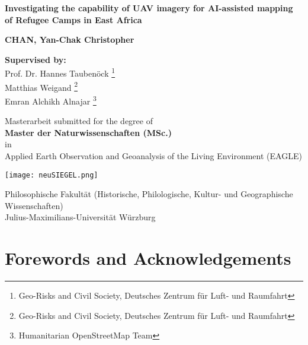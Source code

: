 \documentclass[11pt, a4paper, twoside]{report}
\begin{document}
\begin{titlepage}
   \begin{center}
       \vspace{0.25cm}

       \large
       \textbf{Investigating the capability of UAV imagery for AI-assisted mapping of Refugee Camps in East Africa}

       \vspace{0.75cm}

       \normalsize
       \textbf{CHAN, Yan-Chak Christopher}

       \vfill

       \textbf{Supervised by:} \\
       Prof. Dr. Hannes Taubenöck \thanks{Geo-Risks and Civil Society, Deutsches Zentrum für Luft- und Raumfahrt} \\
       Matthias Weigand \thanks{Geo-Risks and Civil Society, Deutsches Zentrum für Luft- und Raumfahrt}\\
       Emran Alchikh Alnajar \thanks{Humanitarian OpenStreetMap Team}

       \vspace{0.25cm}

       Masterarbeit submitted for the degree of\\
       \textbf{Master der Naturwissenschaften (MSc.)}\\
       in\\
       Applied Earth Observation and Geoanalysis of the Living Environment (EAGLE)

       \vspace{0.5cm}

       \texttt{[image: neuSIEGEL.png]}

       \normalsize
       Philosophische Fakultät (Historische, Philologische, Kultur- und Geographische Wissenschaften)\\
       Julius-Maximilians-Universität Würzburg\\
   \end{center}
\end{titlepage}

\newpage

\section{Forewords and Acknowledgements}
\end{document}
